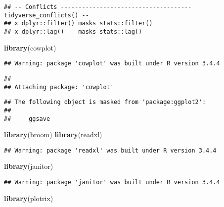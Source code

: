 \documentclass[]{article}
\newenvironment{Shaded}{\begin{snugshade}}{\end{snugshade}}
\newcommand{\KeywordTok}[1]{\textcolor[rgb]{0.13,0.29,0.53}{\textbf{{#1}}}}
\newcommand{\NormalTok}[1]{{#1}}
\begin{document}
\begin{verbatim}
## -- Conflicts ------------------------------------- tidyverse_conflicts() --
## x dplyr::filter() masks stats::filter()
## x dplyr::lag()    masks stats::lag()
\end{verbatim}

\begin{Shaded}
\begin{Highlighting}[]
\KeywordTok{library}\NormalTok{(cowplot)}
\end{Highlighting}
\end{Shaded}

\begin{verbatim}
## Warning: package 'cowplot' was built under R version 3.4.4
\end{verbatim}

\begin{verbatim}
## 
## Attaching package: 'cowplot'
\end{verbatim}

\begin{verbatim}
## The following object is masked from 'package:ggplot2':
## 
##     ggsave
\end{verbatim}

\begin{Shaded}
\begin{Highlighting}[]
\KeywordTok{library}\NormalTok{(broom)}
\KeywordTok{library}\NormalTok{(readxl)}
\end{Highlighting}
\end{Shaded}

\begin{verbatim}
## Warning: package 'readxl' was built under R version 3.4.4
\end{verbatim}

\begin{Shaded}
\begin{Highlighting}[]
\KeywordTok{library}\NormalTok{(janitor)}
\end{Highlighting}
\end{Shaded}

\begin{verbatim}
## Warning: package 'janitor' was built under R version 3.4.4
\end{verbatim}

\begin{Shaded}
\begin{Highlighting}[]
\KeywordTok{library}\NormalTok{(plotrix)}
\end{Highlighting}
\end{Shaded}
\end{document}

